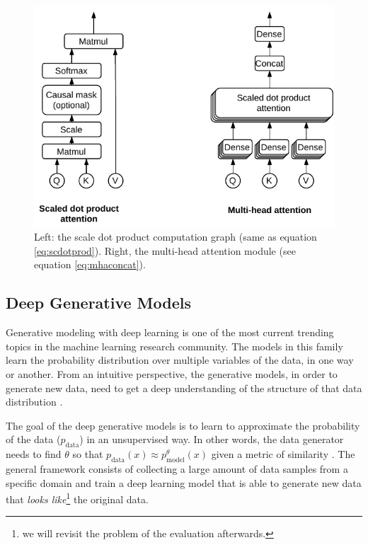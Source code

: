 \begin{figure}
	\centering
	\includegraphics[width=0.85\linewidth]{chapter2/images/attention_modules}
	\caption{Left: the scale dot product computation graph (same as equation \ref{eq:scdotprod}). Right, the multi-head attention module (see equation \ref{eq:mhaconcat}).}
	\label{fig:attentionmodules}
\end{figure}

\subsection{Deep Generative Models} \label{sec:generative}
Generative modeling with deep learning is one of the most current trending topics in the machine learning research community. The models in this family learn the probability distribution over multiple variables of the data, in one way or another. From an intuitive perspective, the generative models, in order to generate new data, need to get a deep understanding of the structure of that data distribution \autocite{Goodfellow2016}.

The goal of the deep generative models is to learn to approximate the probability of the data ($p_\mathrm{data}$) in an unsupervised way. In other words, the data generator needs to find $\theta$ so that $p_\mathrm{data}(x) \approx p_\mathrm{model}^\theta(x)$ given a metric of similarity \autocite{Goodfellow2016}. The general framework consists of collecting a large amount of data samples from a specific domain and train a deep learning model that is able to generate new data that \textit{looks like}\footnote{we will revisit the problem of the evaluation afterwards.} the original data.

